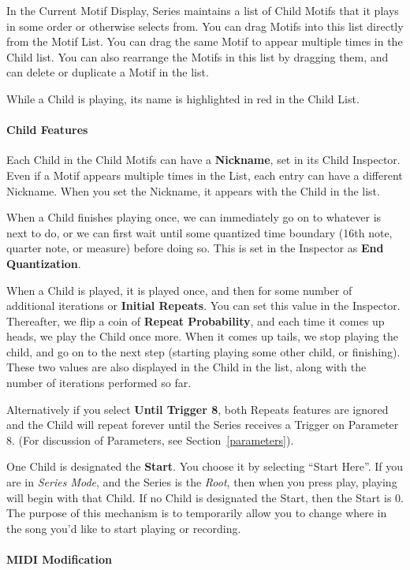 \documentclass[twoside,10pt]{article}
\begin{document}
In the Current Motif Display, Series maintains a list of Child Motifs that it plays in some order or otherwise selects from.  You can drag Motifs into this list directly from the Motif List.  You can drag the same Motif to appear multiple times in the Child list.  You can also rearrange the Motifs in this list by dragging them, and can delete or duplicate a Motif in the list.

While a Child is playing, its name is highlighted in red in the Child List.

\paragraph{Child Features}
Each Child in the Child Motifs can have a {\bf Nickname}, set in its Child Inspector.  Even if a Motif appears multiple times in the List, each entry can have a different Nickname.  When you set the Nickname, it appears with the Child in the list.

When a Child finishes playing once, we can immediately go on to whatever is next to do, or we can first wait until some quantized time boundary (16th note, quarter note, or measure) before doing so.  This is set in the Inspector as {\bf End Quantization}.

When a Child is played, it is played once, and then for some number of additional iterations or {\bf Initial Repeats}.  You can set this value in the Inspector.  Thereafter, we flip a coin of {\bf Repeat Probability}, and each time it comes up heads, we play the Child once more. When it comes up tails, we stop playing the child, and go on to the next step (starting playing some other child, or finishing).  These two values are also displayed in the Child in the list, along with the number of iterations performed so far.

Alternatively if you select {\bf Until Trigger 8}, both Repeats features are ignored and the Child  will repeat forever until the Series receives a Trigger on Parameter 8.  (For discussion of Parameters, see Section~\ref{parameters}).

One Child is designated the {\bf Start}.  You choose it by selecting ``Start Here''.  If you are in {\it Series Mode}, and the Series is the {\it Root}, then when you press play, playing will begin with that Child.  If no Child is designated the Start, then the Start is 0.  The purpose of this mechanism is to temporarily allow you to change where in the song you'd like to start playing or recording.

\paragraph{MIDI Modification}
\end{document}
